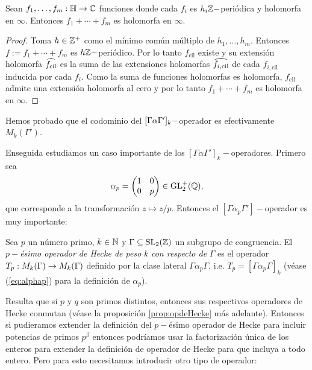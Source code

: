 \begin{nota}
  \begin{lema}
    Sean $f_1,\ldots,f_m:\mathbb{H}\rightarrow\mathbb{C}$ funciones donde cada $f_i$ es $h_i\mathbb{Z}-$peri\'odica y holomorfa en $\infty$.
    Entonces $f_1+\cdots+f_m$ es holomorfa en $\infty$.
  \end{lema}
  \begin{proof}
    Toma $h\in\mathbb{Z}^+$ como el m\'inimo com\'un m\'ultiplo de $h_1,\ldots,h_m$. Entonces
    $f:=f_1+\cdots+f_m$ es $h\mathbb{Z}-$peri\'odico. Por lo tanto $f_{\mathrm{cil}}$ existe y su
    extensi\'on holomorfa $\what{f_{\mathrm{cil}}}$ es la suma de las extensiones
    holomorfas $\what{f_{i,\mathrm{cil}}}$ de cada $f_{i,\mathrm{cil}}$ inducida por cada $f_i$.
    Como la suma de funciones holomorfas es holomorfa, $f_{\mathrm{cil}}$ admite una extensi\'on
    holomorfa al cero y por lo tanto $f_1+\cdots+f_m$ es holomorfa en $\infty$.
  \end{proof}

  Hemos probado que el codominio del $[\Gamma\alpha\Gamma']_k-$operador es efectivamente $M_k(\Gamma')$.
\end{nota}

Enseguida estudiamos un caso importante de los $[\Gamma\alpha\Gamma']_k-$operadores. Primero sea
\begin{equation}\label{eq:alphap}
  \alpha_p=\begin{pmatrix}1 & 0\\ 0 & p\end{pmatrix}\in\mathrm{GL}_2^+(\mathbb{Q}),
\end{equation}
que corresponde a la transformaci\'on $z\mapsto z/p$. Entonces el $[\Gamma\alpha_p\Gamma']-$operador
es muy importante:

\begin{defin}
  Sea $p$ un n\'umero primo, $k\in\mathbb{N}$ y $\Gamma\subseteq\mathrm{SL}_2(\mathbb{Z})$ un subgrupo de congruencia.
  El $p-$\emph{\'esimo operador de Hecke de peso} $k$ \emph{con respecto de} $\Gamma$ es el operador
  $T_p:M_k(\Gamma)\rightarrow M_k(\Gamma)$ definido por la clase lateral $\Gamma\alpha_p\Gamma$, i.e.
  $T_p=[\Gamma\alpha_p\Gamma]_k$ (v\'ease (\ref{eq:alphap}) para la definici\'on de $\alpha_p$).
\end{defin}

Resulta que si $p$ y $q$ son primos distintos, entonces sus respectivos operadores de Hecke
conmutan (v\'ease la proposici\'on \ref{prop:opdeHecke} m\'as adelante). Entonces si pudieramos
extender la definici\'on del $p-$\'esimo operador de Hecke para incluir potencias de primos
$p^{\beta}$ entonces podr\'iamos usar la factorizaci\'on \'unica de los enteros para extender la
definici\'on de operador de Hecke para que incluya a todo entero. Pero para esto necesitamos
introducir otro tipo de operador:

